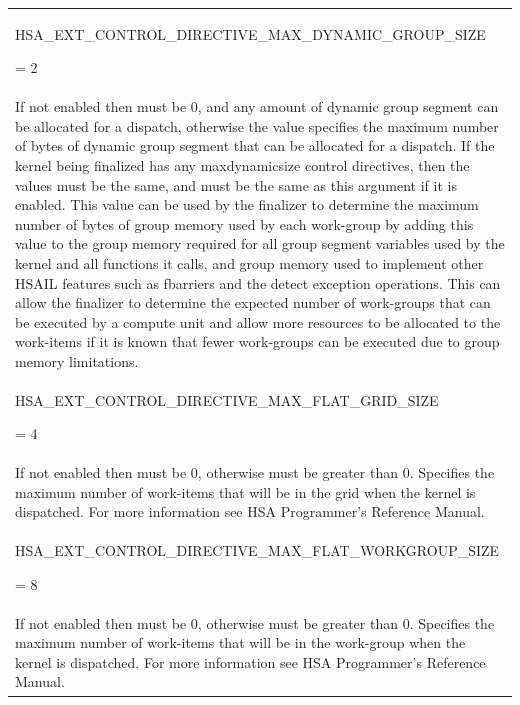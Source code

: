 \documentclass[final]{book}
\newcommand{\reftyp}[1]{#1}
\newcommand{\refenu}[1]{\reftyp{#1}}
\begin{document}
\begin{longtable}{@{\hspace{2em}}p{\linewidth-2em}}
\hspace{-2em}\hypertarget{group__finalizer_1gga143d9e622dfd7889d52fb5eb5ed1ffdba7787b99c887699ca6fe8d1cd4de3477e}{\refenu{HSA_\-EXT_\-CONTROL_\-DIRECTIVE_\-MAX_\-DYNAMIC_\-GROUP_\-SIZE}} = 2\\If not enabled then must be 0, and any amount of dynamic group segment can be allocated for a dispatch, otherwise the value specifies the maximum number of bytes of dynamic group segment that can be allocated for a dispatch. If the kernel being finalized has any maxdynamicsize control directives, then the values must be the same, and must be the same as this argument if it is enabled. This value can be used by the finalizer to determine the maximum number of bytes of group memory used by each work-group by adding this value to the group memory required for all group segment variables used by the kernel and all functions it calls, and group memory used to implement other HSAIL features such as fbarriers and the detect exception operations. This can allow the finalizer to determine the expected number of work-groups that can be executed by a compute unit and allow more resources to be allocated to the work-items if it is known that fewer work-groups can be executed due to group memory limitations.\\[2mm]
\hspace{-2em}\hypertarget{group__finalizer_1gga143d9e622dfd7889d52fb5eb5ed1ffdba8f84c9f5303be293df76bf82b002299c}{\refenu{HSA_\-EXT_\-CONTROL_\-DIRECTIVE_\-MAX_\-FLAT_\-GRID_\-SIZE}} = 4\\If not enabled then must be 0, otherwise must be greater than 0. Specifies the maximum number of work-items that will be in the grid when the kernel is dispatched. For more information see HSA Programmer's Reference Manual.\\[2mm]
\hspace{-2em}\hypertarget{group__finalizer_1gga143d9e622dfd7889d52fb5eb5ed1ffdbaa0e6d7d860284c6cadde5c7e9db66968}{\refenu{HSA_\-EXT_\-CONTROL_\-DIRECTIVE_\-MAX_\-FLAT_\-WORKGROUP_\-SIZE}} = 8\\If not enabled then must be 0, otherwise must be greater than 0. Specifies the maximum number of work-items that will be in the work-group when the kernel is dispatched. For more information see HSA Programmer's Reference Manual.\\[2mm]

\end{longtable}
\end{document}
